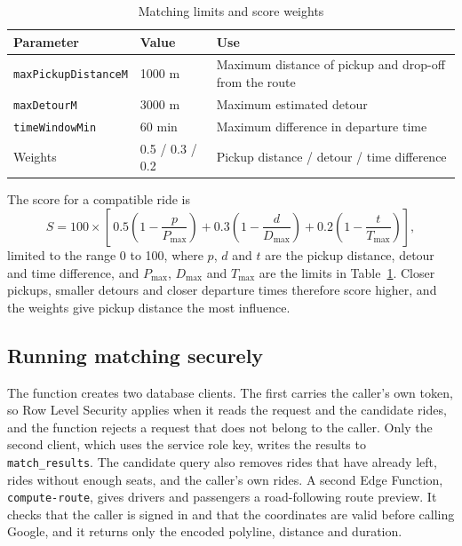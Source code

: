 \begin{table}[htbp]
  \centering
  \caption{Matching limits and score weights}
  \label{tab:thresholds}
  \small
  \begin{tabular}{@{}l l p{}@{}}
    \toprule
    \textbf{Parameter} & \textbf{Value} & \textbf{Use} \\
    \midrule
    \texttt{maxPickupDistanceM} & 1000 m & Maximum distance of pickup and drop-off from the route \\
    \texttt{maxDetourM} & 3000 m & Maximum estimated detour \\
    \texttt{timeWindowMin} & 60 min & Maximum difference in departure time \\
    Weights & 0.5 / 0.3 / 0.2 & Pickup distance / detour / time difference \\
    \bottomrule
  \end{tabular}
\end{table}
 
The score for a compatible ride is
\[
  S = 100 \times \left[\, 0.5\left(1-\frac{p}{P_{\max}}\right) + 0.3\left(1-\frac{d}{D_{\max}}\right) + 0.2\left(1-\frac{t}{T_{\max}}\right) \right],
\]
limited to the range 0 to 100, where $p$, $d$ and $t$ are the pickup distance, detour and time difference, and $P_{\max}$, $D_{\max}$ and $T_{\max}$ are the limits in Table~\ref{tab:thresholds}. Closer pickups, smaller detours and closer departure times therefore score higher, and the weights give pickup distance the most influence. %
 
\subsection{Running matching securely}
 
The function creates two database clients. The first carries the caller's own token, so Row Level Security applies when it reads the request and the candidate rides, and the function rejects a request that does not belong to the caller. Only the second client, which uses the service role key, writes the results to \texttt{match\_results}. The candidate query also removes rides that have already left, rides without enough seats, and the caller's own rides. A second Edge Function, \texttt{compute-route}, gives drivers and passengers a road-following route preview. It checks that the caller is signed in and that the coordinates are valid before calling Google, and it returns only the encoded polyline, distance and duration.
 
